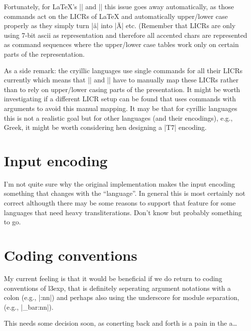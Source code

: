 \documentclass{ltxdoc}
\begin{document}
Fortunately, for \LaTeX{}'s |\MakeUppercase| and |\MakeLowercase| this
issue goes away automatically, as those commands act on the LICRs of
\LaTeX{} and automatically upper/lower case properly as they simply
turn |\"a| into |\"A| etc. (Remember that LICRs are only using 7-bit
ascii as representation and therefore all accented chars are
represented as command sequences where the upper/lower case tables
work only on certain parts of the representation.

As a side remark: the cryillic languages use single commands for all
their LICRs currently which means that |\MakeUppercase| and
|\MakeLowercase| have to manually map these LICRs rather than to rely
on upper/lower casing parts of the presentation. It might be worth
investigating if a different LICR setup can be found that uses
commands with arguments to avoid this manual mapping. It may be that
for cyrillic  languages this is not a realistic goal but for other
languages (and their encodings), e.g., Greek, it might be worth
considering hen designing a |T7| encoding.


\section{Input encoding}

I'm not quite sure why the original implementation makes the input
encoding something that changes with the ``language''. In general this
is most certainly not correct althougth there may be some reasons to
support that feature for some languages that need heavy
transliterations. Don't know but probably something to go.


\section{Coding conventions}

My current feeling is that it would be beneficial if we do return to
coding conventions of l3exp, that is definitely seperating argument
notations with a colon (e.g., |\foo:nn|) and perhaps also using the
underscore for module separation, (e.g., |\foo_bar:nn|).

This needs some decision soon, as conerting back and forth is a pain
in the a\ldots
\end{document}
